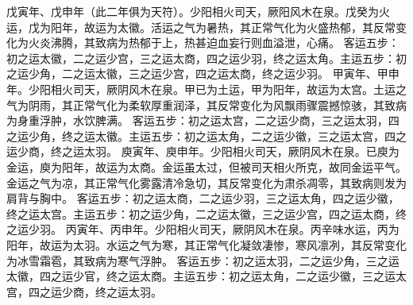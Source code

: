\documentclass[a4paper,12pt,UTF8,twoside]{ctexbook}
\begin{document}
戊寅年、戊申年（此二年俱为天符）。少阳相火司天，厥阳风木在泉。戊癸为火运，戊为阳年，故运为太徽。活运之气为暑热，其正常气化为火盛热郁，其反常变化为火炎沸腾，其致病为热郁于上，热甚迫血妄行则血溢泄，心痛。
客运五步：初之运太徽，二之运少宫，三之运太商，四之运少羽，终之运太角。主运五步：初之运少角，二之运太徽，三之运少宫，四之运太商，终之运少羽。
甲寅年、甲申年。少阳相火司天，厥阴风木在泉。甲已为土运，甲为阳年，故运为太宫。土运之气为阴雨，其正常气化为柔软厚重润泽，其反常变化为风飘雨骤震撼惊骇，其致病为身重浮肿，水饮脾满。
客运五步：初之运太宫，二之运少商，三之运太羽，四之运少角，终之运太徽。主运五步：初之运太角，二之运少徽，三之运太宫，四之运少商，终之运太羽。
庾寅年、庾申年。少阳相火司天，厥阴风木在泉。已庾为金运，庾为阳年，故运为太商。金运虽太过，但被司天相火所克，故同金运平气。金运之气为凉，其正常气化雾露清冷急切，其反常变化为肃杀凋零，其致病则发为肩背与胸中。
客运五步：初之运太商，二之运少羽，三之运太角，四之运少徽，终之运太宫。主运五步：初之运少角，二之运太徽，三之运少宫，四之运太商，终之运少羽。
丙寅年、丙申年。少阳相火司天，厥阴风木在泉。丙辛味水运，丙为阳年，故运为太羽。水运之气为寒，其正常气化凝敛凄惨，寒风凛冽，其反常变化为冰雪霜雹，其致病为寒气浮肿。
客运五步：初之运太羽，二之运少角，三之运太徽，四之运少官，终之运太商。主运五步：初之运太角，二之运少徽，三之运太宫，四之运少商，终之运太羽。
\end{document}
